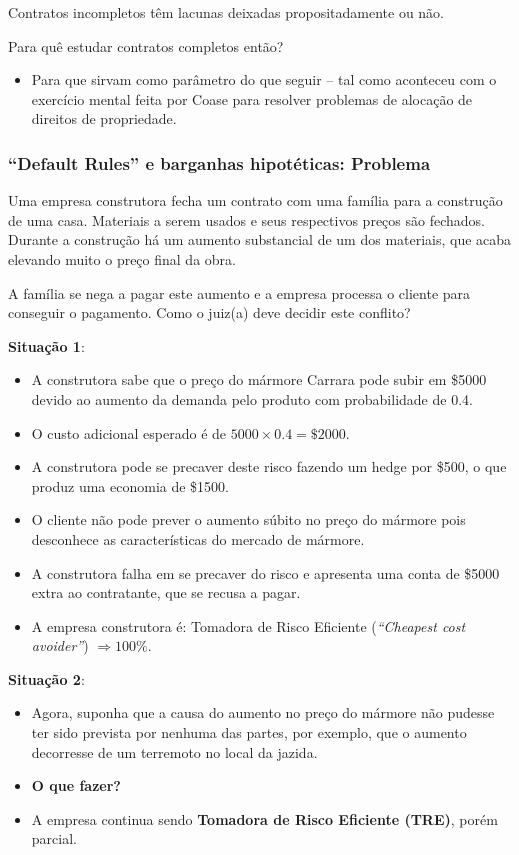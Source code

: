 \documentclass[a4paper,12pt]{article}[abntex2]
\begin{document}
Contratos incompletos têm lacunas deixadas propositadamente ou não. 

Para quê estudar contratos completos então?\begin{itemize}
    \item Para que sirvam como parâmetro do que seguir – tal como aconteceu com o exercício mental feita por Coase para resolver problemas de alocação de direitos de propriedade.  
\end{itemize}

\subsubsection{\textbf{“Default Rules” e barganhas hipotéticas: Problema}}
Uma empresa construtora fecha um contrato com uma família para a construção de uma casa. Materiais a serem usados e seus respectivos preços são fechados. Durante a construção há um aumento substancial de um dos materiais, que acaba elevando muito o preço final da obra. 

A família se nega a pagar este aumento e a empresa processa o cliente para conseguir o pagamento. Como o juiz(a) deve decidir este conflito?

\textbf{Situação 1}:\begin{itemize}
    \item A construtora sabe que o preço do mármore Carrara pode subir em \$5000 devido ao aumento da demanda pelo produto com probabilidade de 0.4.
    \item O custo adicional esperado é de \( 5000 \times 0.4 = \$2000 \).
    \item A construtora pode se precaver deste risco fazendo um hedge por \$500, o que produz uma economia de \$1500.
    \item O cliente não pode prever o aumento súbito no preço do mármore pois desconhece as características do mercado de mármore.
    \item A construtora falha em se precaver do risco e apresenta uma conta de \$5000 extra ao contratante, que se recusa a pagar.
    \item A empresa construtora é: Tomadora de Risco Eficiente (\textit{“Cheapest cost avoider”}) \(\Rightarrow 100\%\).
\end{itemize}

\textbf{Situação 2}:\begin{itemize}
    \item Agora, suponha que a causa do aumento no preço do mármore não pudesse ter sido prevista por nenhuma das partes, por exemplo, que o aumento decorresse de um terremoto no local da jazida.
    \item \textbf{O que fazer?}
    \item A empresa continua sendo \textbf{Tomadora de Risco Eficiente (TRE)}, porém parcial.
\end{itemize}
\end{document}

